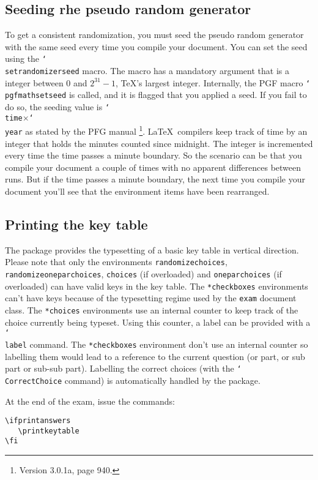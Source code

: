 \documentclass[12pt,a4paper]{exam}
\providecommand{\texorpdfstring}[2]{#1}
\newcommand{\bs}{\texorpdfstring{\char`\\}{}}
\begin{document}
\subsection{Seeding rhe pseudo random generator}
\label{sec:seeding}
To get a consistent randomization, you must seed the pseudo random generator
with the same seed every time you compile your document. You can set the
seed using the \texttt{\bs setrandomizerseed} macro. The macro has a mandatory
argument that is a integer between 0 and $2^{31}-1$, \TeX's largest integer.
Internally, the PGF macro \texttt{\bs pgfmathsetseed} is called, and it is
flagged that you applied a seed. If you fail to do so, the seeding value is
\texttt{\bs time}$\times$\texttt{\bs year} as stated by the PFG manual%
\footnote{Version 3.0.1a, page 940.}. \LaTeX\ compilers keep track of
time by an integer that holds the minutes counted since midnight. The integer is
incremented every time the time passes a minute boundary. So the scenario
can be that you compile your document a couple of times with no apparent
differences between runs. But if the time passes a minute boundary, the
next time you compile your document you'll see that the environment items
have been rearranged.


\subsection{Printing the key table}
The package provides the typesetting of a basic key table in vertical direction.
Please note that only the environments \texttt{randomizechoices},
\texttt{randomizeoneparchoices}, \texttt{choices} (if overloaded) and
\texttt{oneparchoices} (if overloaded) can have valid keys in the key table.
The \texttt{*checkboxes} environments can't 
have keys because of the typesetting regime used by the \texttt{exam}
document class. The \texttt{*choices} environments use an internal counter
to keep track of the choice currently being typeset. Using this counter, a
label can be provided with a \texttt{\bs label} command.
The \texttt{*checkboxes} environment don't use an internal counter so 
labelling them would lead to a reference to the current question (or part,
or sub part or sub-sub part). Labelling the correct choices (with the
\texttt{\bs CorrectChoice} command) is automatically handled by the
package.

At the end of the exam, issue the commands:

\begin{lstlisting}
\ifprintanswers
   \printkeytable
\fi
\end{lstlisting}
\end{document}
